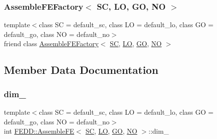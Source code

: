 \subsubsection{\texorpdfstring{Assemble\+F\+E\+Factory$<$ S\+C, L\+O, G\+O, N\+O $>$}{AssembleFEFactory< SC, LO, GO, NO >}}
{\footnotesize\ttfamily template$<$class SC  = default\+\_\+sc, class LO  = default\+\_\+lo, class GO  = default\+\_\+go, class NO  = default\+\_\+no$>$ \\
friend class \hyperlink{classFEDD_1_1AssembleFEFactory}{Assemble\+F\+E\+Factory}$<$ \hyperlink{fe__test__laplace_8cpp_a79c7e86a57edbb2a5a53242bcd04e41e}{SC}, \hyperlink{fe__test__laplace_8cpp_ad6a38c9f07d3fd633eefca5bccad8410}{LO}, \hyperlink{fe__test__laplace_8cpp_afa2946b509009b4f45eb04bd8c5b27d9}{GO}, \hyperlink{fe__test__laplace_8cpp_a5e24f37b28787429872b6ecb1d0417ce}{NO} $>$\hspace{0.3cm}{\ttfamily [friend]}}



\subsection{Member Data Documentation}
\mbox{\label{classFEDD_1_1AssembleFE_a8419f1d876b0da5f920ab3d1d21e0401}} 
\subsubsection{\texorpdfstring{dim\+\_\+}{dim\_}}
{\footnotesize\ttfamily template$<$class SC  = default\+\_\+sc, class LO  = default\+\_\+lo, class GO  = default\+\_\+go, class NO  = default\+\_\+no$>$ \\
int \hyperlink{classFEDD_1_1AssembleFE}{F\+E\+D\+D\+::\+Assemble\+FE}$<$ \hyperlink{fe__test__laplace_8cpp_a79c7e86a57edbb2a5a53242bcd04e41e}{SC}, \hyperlink{fe__test__laplace_8cpp_ad6a38c9f07d3fd633eefca5bccad8410}{LO}, \hyperlink{fe__test__laplace_8cpp_afa2946b509009b4f45eb04bd8c5b27d9}{GO}, \hyperlink{fe__test__laplace_8cpp_a5e24f37b28787429872b6ecb1d0417ce}{NO} $>$\+::dim\+\_\+\hspace{0.3cm}{\ttfamily [protected]}}

\mbox{\label{classFEDD_1_1AssembleFE_afd156e8e0ad2ca015a604290919d5794}} 

